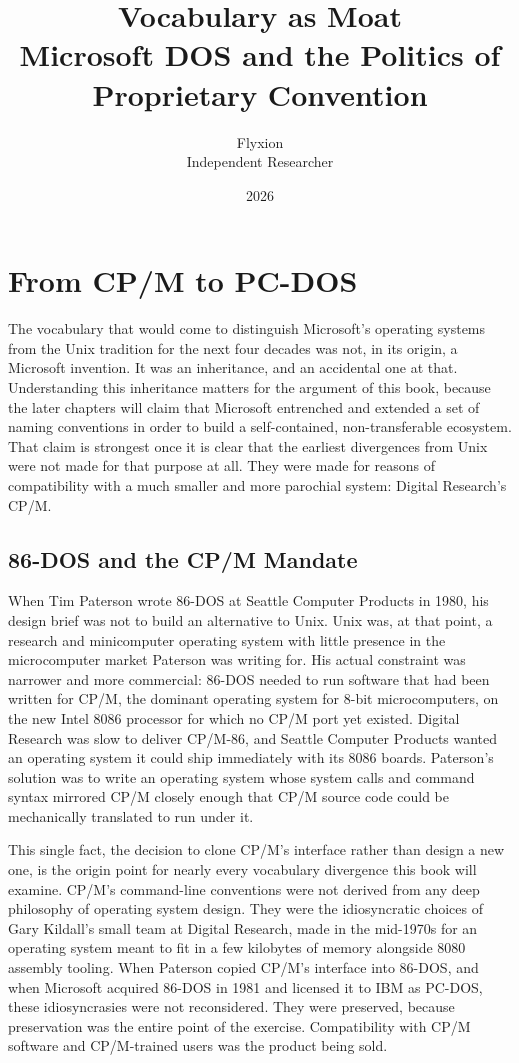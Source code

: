 \documentclass[11pt]{book}
\title{\textbf{Vocabulary as Moat}\\[0.3em]\large Microsoft DOS and the Politics of Proprietary Convention}
\author{Flyxion \\ \small Independent Researcher}
\date{2026}
\begin{document}
\frontmatter
\maketitle

\tableofcontents

\mainmatter

\chapter{From CP/M to PC-DOS}

The vocabulary that would come to distinguish Microsoft's operating systems from the Unix tradition for the next four decades was not, in its origin, a Microsoft invention. It was an inheritance, and an accidental one at that. Understanding this inheritance matters for the argument of this book, because the later chapters will claim that Microsoft entrenched and extended a set of naming conventions in order to build a self-contained, non-transferable ecosystem. That claim is strongest once it is clear that the earliest divergences from Unix were not made for that purpose at all. They were made for reasons of compatibility with a much smaller and more parochial system: Digital Research's CP/M.

\section{86-DOS and the CP/M Mandate}

When Tim Paterson wrote 86-DOS at Seattle Computer Products in 1980, his design brief was not to build an alternative to Unix. Unix was, at that point, a research and minicomputer operating system with little presence in the microcomputer market Paterson was writing for. His actual constraint was narrower and more commercial: 86-DOS needed to run software that had been written for CP/M, the dominant operating system for 8-bit microcomputers, on the new Intel 8086 processor for which no CP/M port yet existed. Digital Research was slow to deliver CP/M-86, and Seattle Computer Products wanted an operating system it could ship immediately with its 8086 boards. Paterson's solution was to write an operating system whose system calls and command syntax mirrored CP/M closely enough that CP/M source code could be mechanically translated to run under it.

This single fact, the decision to clone CP/M's interface rather than design a new one, is the origin point for nearly every vocabulary divergence this book will examine. CP/M's command-line conventions were not derived from any deep philosophy of operating system design. They were the idiosyncratic choices of Gary Kildall's small team at Digital Research, made in the mid-1970s for an operating system meant to fit in a few kilobytes of memory alongside 8080 assembly tooling. When Paterson copied CP/M's interface into 86-DOS, and when Microsoft acquired 86-DOS in 1981 and licensed it to IBM as PC-DOS, these idiosyncrasies were not reconsidered. They were preserved, because preservation was the entire point of the exercise. Compatibility with CP/M software and CP/M-trained users was the product being sold.
\end{document}
